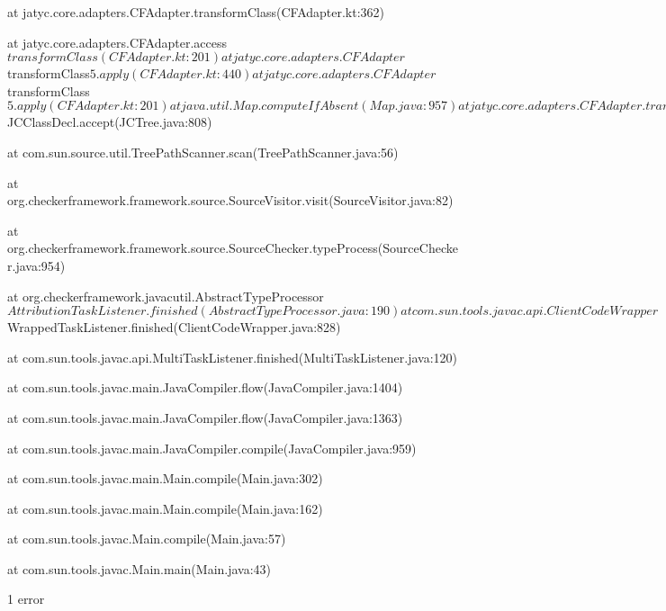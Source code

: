 \begin{code}
  	at jatyc.core.adapters.CFAdapter.transformClass(CFAdapter.kt:362)

  	at jatyc.core.adapters.CFAdapter.access$transformClass(CFAdapter.kt:201)

  	at jatyc.core.adapters.CFAdapter$transformClass$5.apply(CFAdapter.kt:440)

  	at jatyc.core.adapters.CFAdapter$transformClass$5.apply(CFAdapter.kt:201)

  	at java.util.Map.computeIfAbsent(Map.java:957)

  	at jatyc.core.adapters.CFAdapter.transformClass(CFAdapter.kt:437)

  	at jatyc.core.adapters.CFVisitor.visitClass(CFVisitor.kt:45)

  	at jatyc.core.adapters.CFVisitor.visitClass(CFVisitor.kt:28)

  	at com.sun.tools.javac.tree.JCTree$JCClassDecl.accept(JCTree.java:808)

  	at com.sun.source.util.TreePathScanner.scan(TreePathScanner.java:56)

  	at org.checkerframework.framework.source.SourceVisitor.visit(SourceVisitor.java:82)

  	at org.checkerframework.framework.source.SourceChecker.typeProcess(SourceChecker.java:954)

  	at org.checkerframework.javacutil.AbstractTypeProcessor$AttributionTaskListener.finished(AbstractTypeProcessor.java:190)

  	at com.sun.tools.javac.api.ClientCodeWrapper$WrappedTaskListener.finished(ClientCodeWrapper.java:828)

  	at com.sun.tools.javac.api.MultiTaskListener.finished(MultiTaskListener.java:120)

  	at com.sun.tools.javac.main.JavaCompiler.flow(JavaCompiler.java:1404)

  	at com.sun.tools.javac.main.JavaCompiler.flow(JavaCompiler.java:1363)

  	at com.sun.tools.javac.main.JavaCompiler.compile(JavaCompiler.java:959)

  	at com.sun.tools.javac.main.Main.compile(Main.java:302)

  	at com.sun.tools.javac.main.Main.compile(Main.java:162)

  	at com.sun.tools.javac.Main.compile(Main.java:57)

  	at com.sun.tools.javac.Main.main(Main.java:43)

1 error
\end{code}

